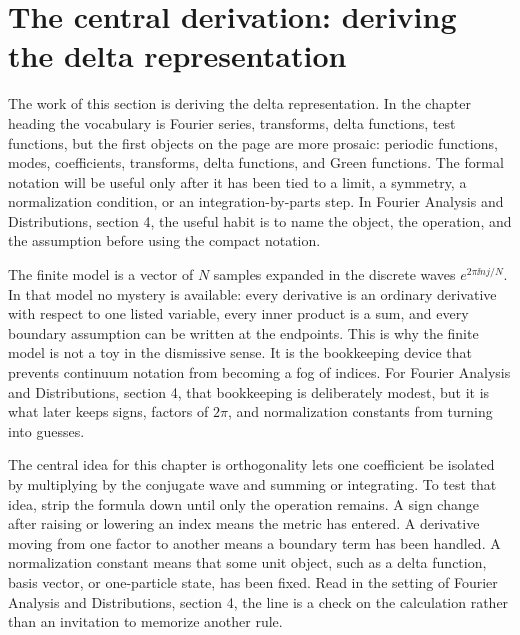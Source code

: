 \section{The central derivation: deriving the delta representation}













The work of this section is deriving the delta representation.  In the chapter heading the vocabulary is Fourier series, transforms, delta functions, test functions, but the first objects on the page are more prosaic: periodic functions, modes, coefficients, transforms, delta functions, and Green functions.  The formal notation will be useful only after it has been tied to a limit, a symmetry, a normalization condition, or an integration-by-parts step.  In Fourier Analysis and Distributions, section 4, the useful habit is to name the object, the operation, and the assumption before using the compact notation.

The finite model is a vector of \(N\) samples expanded in the discrete waves \(e^{2\pi \ii nj/N}\).  In that model no mystery is available: every derivative is an ordinary derivative with respect to one listed variable, every inner product is a sum, and every boundary assumption can be written at the endpoints.  This is why the finite model is not a toy in the dismissive sense.  It is the bookkeeping device that prevents continuum notation from becoming a fog of indices.  For Fourier Analysis and Distributions, section 4, that bookkeeping is deliberately modest, but it is what later keeps signs, factors of \(2\pi\), and normalization constants from turning into guesses.

The central idea for this chapter is orthogonality lets one coefficient be isolated by multiplying by the conjugate wave and summing or integrating.  To test that idea, strip the formula down until only the operation remains.  A sign change after raising or lowering an index means the metric has entered.  A derivative moving from one factor to another means a boundary term has been handled.  A normalization constant means that some unit object, such as a delta function, basis vector, or one-particle state, has been fixed.  Read in the setting of Fourier Analysis and Distributions, section 4, the line is a check on the calculation rather than an invitation to memorize another rule.

